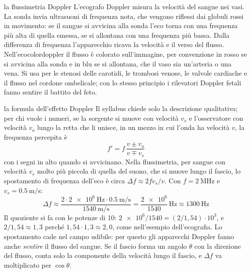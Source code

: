 

\begin{applicazione}{la flussimetria Doppler}
L'ecografo Doppler misura la velocità del sangue nei vasi. La sonda invia ultrasuoni di frequenza nota, che vengono riflessi dai globuli rossi in movimento: se il sangue si avvicina alla sonda l'eco torna con una frequenza più alta di quella emessa, se si allontana con una frequenza più bassa. Dalla differenza di frequenza l'apparecchio ricava la velocità e il verso del flusso. Nell'ecocolordoppler il flusso è colorato sull'immagine, per convenzione in rosso se si avvicina alla sonda e in blu se si allontana, che il vaso sia un'arteria o una vena. Si usa per le stenosi delle carotidi, le trombosi venose, le valvole cardiache e il flusso nel cordone ombelicale; con lo stesso principio i rilevatori Doppler fetali fanno sentire il battito del feto.
\end{applicazione}

\begin{approfondimento}{la formula dell'effetto Doppler}
Il syllabus chiede solo la descrizione qualitativa; per chi vuole i numeri, se la sorgente si muove con velocità $v_s$ e l'osservatore con velocità $v_o$ lungo la retta che li unisce, in un mezzo in cui l'onda ha velocità $v$, la frequenza percepita è
\[
  f' = f\,\frac{v \pm v_o}{v \mp v_s}
\]
con i segni in alto quando si avvicinano. Nella flussimetria, per sangue con velocità $v_s$ molto più piccola di quella del suono, che si muove lungo il fascio, lo spostamento di frequenza dell'eco è circa $\Delta f \approx 2 f v_s / v$. Con $f = \SI{2}{\mega\hertz}$ e $v_s = \SI{0,5}{\metre\per\second}$:
\[
  \Delta f \approx \frac{2 \cdot \SI{2e6}{\hertz} \cdot \SI{0,5}{\metre\per\second}}{\SI{1540}{\metre\per\second}} = \frac{\num{2e6}}{1540}\,\si{\hertz} \approx \SI{1300}{\hertz}
\]
Il quoziente si fa con le potenze di 10: $\num{2e6}/1540 = (2/1{,}54) \cdot 10^{3}$, e $2/1{,}54 \approx 1{,}3$ perché $1{,}54 \cdot 1{,}3 \approx 2{,}0$, come nell'esempio dell'ecografia. Lo spostamento cade nel campo udibile: per questo gli apparecchi Doppler fanno anche \emph{sentire} il flusso del sangue. Se il fascio forma un angolo $\theta$ con la direzione del flusso, conta solo la componente della velocità lungo il fascio, e $\Delta f$ va moltiplicato per $\cos\theta$.
\end{approfondimento}

\riepilogoformule
